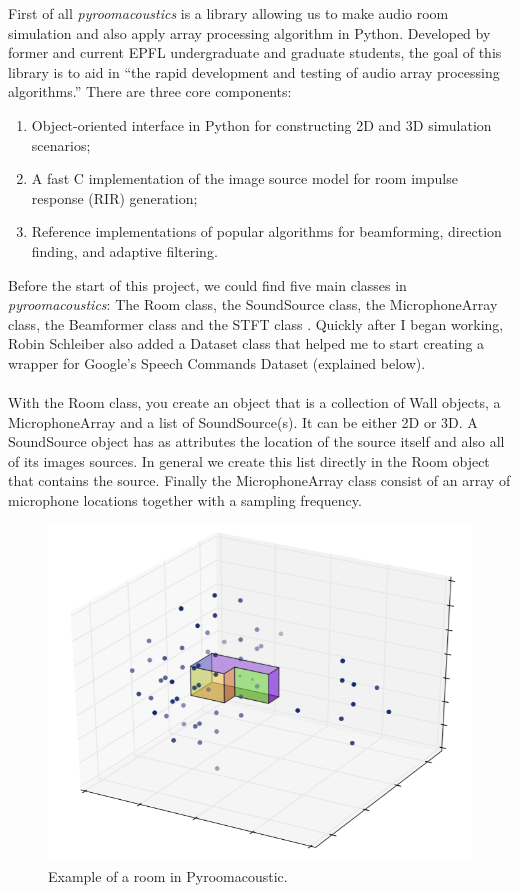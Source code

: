 \documentclass[11pt,a4paper,titlepage]{report}
\providecommand{\tightlist}{%
	\setlength{\itemsep}{0pt}\setlength{\parskip}{0pt}}
\begin{document}
\hspace*{0.6cm}
First of all \textit{pyroomacoustics} is a library allowing us to make audio room simulation  and also apply array processing algorithm in Python. Developed by former and current EPFL undergraduate and graduate students, the goal of this library is to aid in ``the rapid development and testing of audio array processing algorithms.'' There are three core components:
\begin{enumerate}
	\tightlist
	\item Object-oriented interface in Python for constructing 2D and 3D simulation scenarios;
	\item A fast C implementation of the image source model for room impulse response (RIR) generation;
	\item Reference implementations of popular algorithms for beamforming, direction finding, and adaptive filtering.
\end{enumerate} 
\hspace*{0.6cm} 
Before the start of this project, we could find five main classes in \textit{pyroomacoustics}: The Room class, the SoundSource class, the MicrophoneArray class, the Beamformer class and the STFT class . Quickly after I began working, Robin Schleiber also added a Dataset class that helped me to start creating a wrapper for Google's Speech Commands Dataset (explained below).\\
\\
\hspace{0.6cm}
With the Room class, you create an object that is a collection of Wall objects, a MicrophoneArray and a list of SoundSource(s). It can be either 2D or 3D.
A SoundSource object has as attributes the location of the source itself and also all of its images sources. In general we create this list directly in the Room object that contains the source.
Finally the MicrophoneArray class consist of an array of microphone locations together with a sampling frequency.
\begin{figure}[h!]
	\centering
	\includegraphics[width=0.7\linewidth]{rapport1}
	\caption[Example of a room in Pyroomacoustic]{Example of a room in Pyroomacoustic.}
\end{figure}
\end{document}
